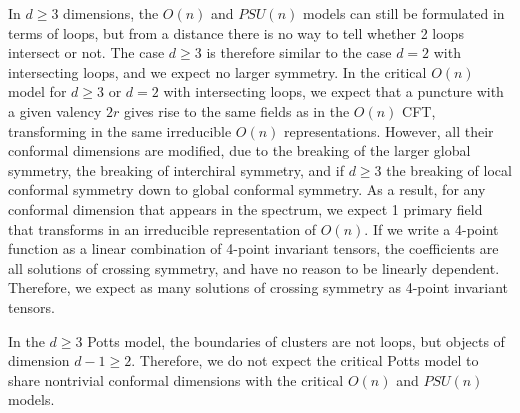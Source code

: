 \documentclass[12pt, a4paper]{article}
\begin{document}
In $d\geq 3$ dimensions, the $O(n)$ and $PSU(n)$ models can still be formulated in terms of loops, but
from a distance there is no way to tell whether 2 loops intersect or not. The case $d\geq 3$ is therefore similar to the case $d=2$ with intersecting loops, and we expect no larger symmetry. 
In the critical $O(n)$ model for $d\geq 3$ or $d=2$ with intersecting loops, we expect that a puncture with a given valency $2r$ gives rise to the same fields as in the $O(n)$ CFT, transforming in the same irreducible $O(n)$ representations. However, all their conformal dimensions are modified, due to the breaking of the larger global symmetry, the breaking of interchiral symmetry, and if $d\geq 3$ the breaking of local conformal symmetry down to global conformal symmetry. As a result, for any conformal dimension that appears in the spectrum, we expect 1 primary field that transforms in an irreducible representation of $O(n)$. If we write a 4-point function as a linear combination of 4-point invariant tensors, the coefficients are all solutions of crossing symmetry, and have no reason to be linearly dependent. Therefore, we expect as many solutions of crossing symmetry as 4-point invariant tensors. 

In the $d\geq 3$ Potts model, the boundaries of clusters are not loops, but objects of dimension $d-1\geq 2$. Therefore, we do not expect the critical Potts model to share nontrivial conformal dimensions with the critical $O(n)$ and $PSU(n)$ models.


%



\pagebreak

\printindex
\end{document}
